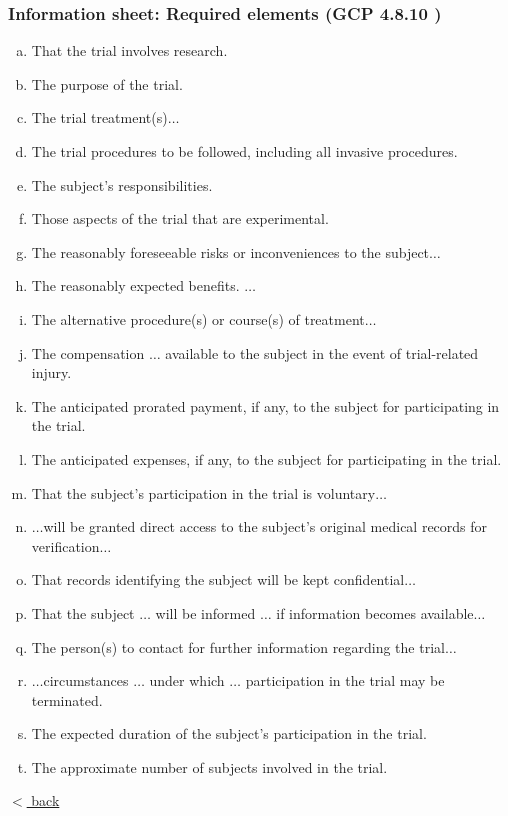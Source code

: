 \documentclass[xcolor=dvipsnames]{beamer}
\begin{document}
\begin{frame}
	\frametitle{Information sheet: Required elements (GCP 4.8.10 {\scriptsize\cite{ICH1996GCP}})}

  	\begin{enumerate}[(a)]\scriptsize
	\item That the trial involves research. 
	\item The purpose of the trial. 
	\item The trial treatment(s)$\dots$  
	\item The trial procedures to be followed, including all invasive procedures. 
	\item The subject's responsibilities. 
	\item Those aspects of the trial that are experimental. 
	\item The reasonably foreseeable risks or inconveniences to the subject$\dots$ 
	\item The reasonably expected benefits. $\dots$
	\item The alternative procedure(s) or course(s) of treatment$\dots$ 
	\item The compensation $\dots$ available to the subject in the event of trial-related injury. 
	\item The anticipated prorated payment, if any, to the subject for participating in the trial. 
	\item The anticipated expenses, if any, to the subject for participating in the trial. 
	\item That the subject's participation in the trial is voluntary$\dots$ 
	\item $\dots$will be granted direct access to the subject's original medical records for verification$\dots$
	\item That records identifying the subject will be kept confidential$\dots$
	\item That the subject $\dots$ will be informed $\dots$ if information becomes available$\dots$ 
	\item The person(s) to contact for further information regarding the trial$\dots$ 
	\item $\dots$circumstances $\dots$ under which $\dots$ participation in the trial may be terminated. 
	\item The expected duration of the subject's participation in the trial. 
	\item The approximate number of subjects involved in the trial. 
	\end{enumerate}
		
	{\color{blue}\hyperlink{Informed consent and copyright transfers}{$<$ back}}
	
\end{frame}
\end{document}
